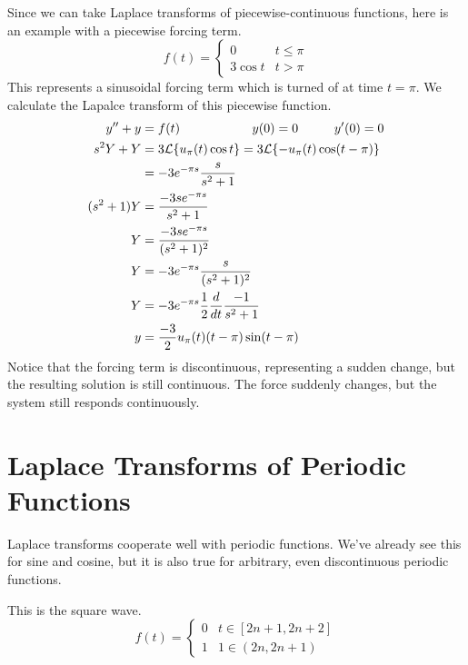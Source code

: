 \documentclass[fleqn,letterpaper]{report}
\begin{document}
\begin{example}
Since we can take Laplace transforms of piecewise-continuous
functions, here is an example with a piecewise forcing term. 
\begin{equation*}
f(t) = \left\{ \begin{matrix} 0 & t \leq \pi \\ 3 \cos t & t >
\pi \end{matrix} \right.
\end{equation*}
This represents a sinusoidal forcing term which is turned of
at time $t=\pi$. We calculate the Lapalce transform of this
piecewise function.
\begin{align*}
y^{\prime \prime} + y & = f(t) \hspace{2cm} y(0) = 0
\hspace{1cm} y^\prime(0) = 0 \\
s^2Y + Y & = 3 \mathcal{L} \{ u_\pi(t) \cos t\} = 3 \mathcal{L} \{ -u_\pi(t)
\cos (t-\pi) \} \\
& = -3 e^{-\pi s} \frac{s}{s^2+1} \\
(s^2+1)Y & = \frac{-3se^{-\pi s}}{s^2+1} \\
Y & = \frac{-3se^{-\pi s}}{(s^2+1)^2} \\
Y & = -3e^{-\pi s} \frac{s}{(s^2+1)^2} \\
Y & = -3e^{-\pi s} \frac{1}{2} \frac{d}{dt} \frac{-1}{s^2+1} \\
y & = \frac{-3}{2} u_{\pi}(t) (t-\pi) \sin (t-\pi)
\end{align*} 
Notice that the forcing term is discontinuous, representing a
sudden change, but the resulting solution is still continuous.
The force suddenly changes, but the system still responds
continuously.
\end{example}

\section{Laplace Transforms of Periodic Functions}
\label{laplace-periodic}

Laplace transforms cooperate well with periodic functions. We've
already see this for sine and cosine, but it is also true for
arbitrary, even discontinuous periodic functions. 

\begin{example}
This is the square wave. 
\begin{equation*}
f(t) = \left\{ \begin{matrix} 0 & t \in [2n+1, 2n+2] \\1
& 1 \in (2n, 2n+1) \end{matrix} \right.
\end{equation*}
\end{example}
\end{document}
